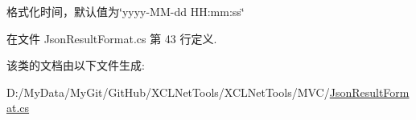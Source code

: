 格式化时间，默认值为\char`\"{}yyyy-\/\-M\-M-\/dd H\-H\-:mm\-:ss\char`\"{} 



在文件 Json\-Result\-Format.\-cs 第 43 行定义.



该类的文档由以下文件生成\-:\begin{DoxyCompactItemize}
\item 
D\-:/\-My\-Data/\-My\-Git/\-Git\-Hub/\-X\-C\-L\-Net\-Tools/\-X\-C\-L\-Net\-Tools/\-M\-V\-C/\hyperlink{_json_result_format_8cs}{Json\-Result\-Format.\-cs}\end{DoxyCompactItemize}
